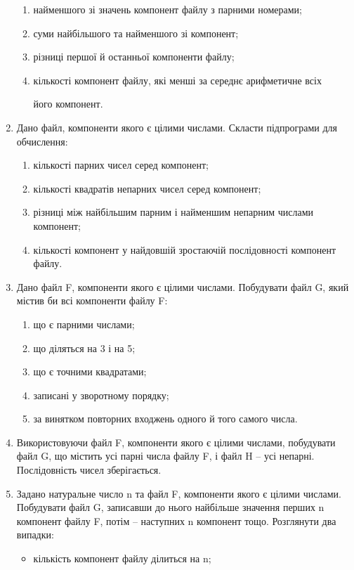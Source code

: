 \documentclass[]{article}
\makeatletter
\newcommand{\xslalph}[1]{\expandafter\@xslalph\csname c@#1\endcsname}
\newcommand{\@xslalph}[1]{%
    \ifcase#1\or а\or б\or в\or г\or д\or e\or є\or ж\or з\or i%
    \or й\or к\or л\or м\or н\or о\or п\or р\or с\or т%
    \or у\or ф\or х\or ц\or ч\or ш\or ю\or я\or аа\or бб\or вв %
    \else\@ctrerr\fi%
}
\makeatother
\begin{document}
\begin{enumerate}
\begin{enumerate}[label=\xslalph*)]
\item найменшого зі значень компонент файлу з парними номерами;

\item суми найбільшого та найменшого зі компонент;

\item різниці першої й останньої компоненти файлу;

\item кількості компонент файлу, які менші за середнє арифметичне всіх

його компонент.
\end{enumerate}

\item
Дано файл, компоненти якого є
цілими числами. Скласти підпрограми для обчислення:
\begin{enumerate}[label=\xslalph*)]
\item  кількості парних чисел серед компонент;
\item кількості квадратів непарних чисел серед компонент;
\item різниці між найбільшим парним і найменшим непарним числами
компонент;
\item кількості компонент у найдовшій зростаючій послідовності компонент
файлу.
\end{enumerate}
\item
Дано файл F, компоненти якого є цілими числами. Побудувати файл G, який
містив би всі компоненти файлу F:
\begin{enumerate}[label=\xslalph*)]
\item
що є парними числами;
\item що діляться на 3 і на 5;
\item що є точними квадратами;
\item записані у зворотному порядку;
\item за винятком повторних входжень одного й того самого числа.
\end{enumerate}
\item
Використовуючи файл F, компоненти якого є цілими числами, побудувати
файл G, що містить усі парні числа файлу F, і файл H -- усі непарні.
Послідовність чисел зберігається.
\item
Задано натуральне число n та файл F, компоненти якого є цілими числами.
Побудувати файл G, записавши до нього найбільше значення перших n
компонент файлу F, потім -- наступних n компонент тощо. Розглянути два
випадки:
\begin{itemize}
\item кількість компонент файлу ділиться на n;

\end{itemize}
\end{enumerate}
\end{document}
